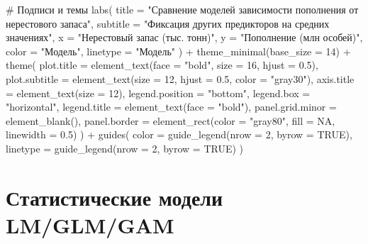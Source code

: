 \documentclass[
  letterpaper,
  DIV=11,
  numbers=noendperiod]{scrreprt}
\newenvironment{Shaded}{\begin{snugshade}}{\end{snugshade}}
\newcommand{\AttributeTok}[1]{\textcolor[rgb]{0.40,0.45,0.13}{#1}}
\newcommand{\CommentTok}[1]{\textcolor[rgb]{0.37,0.37,0.37}{#1}}
\newcommand{\ConstantTok}[1]{\textcolor[rgb]{0.56,0.35,0.01}{#1}}
\newcommand{\DecValTok}[1]{\textcolor[rgb]{0.68,0.00,0.00}{#1}}
\newcommand{\FloatTok}[1]{\textcolor[rgb]{0.68,0.00,0.00}{#1}}
\newcommand{\FunctionTok}[1]{\textcolor[rgb]{0.28,0.35,0.67}{#1}}
\newcommand{\NormalTok}[1]{\textcolor[rgb]{0.00,0.23,0.31}{#1}}
\newcommand{\SpecialCharTok}[1]{\textcolor[rgb]{0.37,0.37,0.37}{#1}}
\newcommand{\StringTok}[1]{\textcolor[rgb]{0.13,0.47,0.30}{#1}}
\begin{document}
\begin{Shaded}
\begin{Highlighting}[]
  \CommentTok{\# Подписи и темы}
  \FunctionTok{labs}\NormalTok{(}
    \AttributeTok{title =} \StringTok{"Сравнение моделей зависимости пополнения от нерестового запаса"}\NormalTok{,}
    \AttributeTok{subtitle =} \StringTok{"Фиксация других предикторов на средних значениях"}\NormalTok{,}
    \AttributeTok{x =} \StringTok{"Нерестовый запас (тыс. тонн)"}\NormalTok{,}
    \AttributeTok{y =} \StringTok{"Пополнение (млн особей)"}\NormalTok{,}
    \AttributeTok{color =} \StringTok{"Модель"}\NormalTok{,}
    \AttributeTok{linetype =} \StringTok{"Модель"}
\NormalTok{  ) }\SpecialCharTok{+}
  \FunctionTok{theme\_minimal}\NormalTok{(}\AttributeTok{base\_size =} \DecValTok{14}\NormalTok{) }\SpecialCharTok{+}
  \FunctionTok{theme}\NormalTok{(}
    \AttributeTok{plot.title =} \FunctionTok{element\_text}\NormalTok{(}\AttributeTok{face =} \StringTok{"bold"}\NormalTok{, }\AttributeTok{size =} \DecValTok{16}\NormalTok{, }\AttributeTok{hjust =} \FloatTok{0.5}\NormalTok{),}
    \AttributeTok{plot.subtitle =} \FunctionTok{element\_text}\NormalTok{(}\AttributeTok{size =} \DecValTok{12}\NormalTok{, }\AttributeTok{hjust =} \FloatTok{0.5}\NormalTok{, }\AttributeTok{color =} \StringTok{"gray30"}\NormalTok{),}
    \AttributeTok{axis.title =} \FunctionTok{element\_text}\NormalTok{(}\AttributeTok{size =} \DecValTok{12}\NormalTok{),}
    \AttributeTok{legend.position =} \StringTok{"bottom"}\NormalTok{,}
    \AttributeTok{legend.box =} \StringTok{"horizontal"}\NormalTok{,}
    \AttributeTok{legend.title =} \FunctionTok{element\_text}\NormalTok{(}\AttributeTok{face =} \StringTok{"bold"}\NormalTok{),}
    \AttributeTok{panel.grid.minor =} \FunctionTok{element\_blank}\NormalTok{(),}
    \AttributeTok{panel.border =} \FunctionTok{element\_rect}\NormalTok{(}\AttributeTok{color =} \StringTok{"gray80"}\NormalTok{, }\AttributeTok{fill =} \ConstantTok{NA}\NormalTok{, }\AttributeTok{linewidth =} \FloatTok{0.5}\NormalTok{)}
\NormalTok{  ) }\SpecialCharTok{+}
  \FunctionTok{guides}\NormalTok{(}
    \AttributeTok{color =} \FunctionTok{guide\_legend}\NormalTok{(}\AttributeTok{nrow =} \DecValTok{2}\NormalTok{, }\AttributeTok{byrow =} \ConstantTok{TRUE}\NormalTok{),}
    \AttributeTok{linetype =} \FunctionTok{guide\_legend}\NormalTok{(}\AttributeTok{nrow =} \DecValTok{2}\NormalTok{, }\AttributeTok{byrow =} \ConstantTok{TRUE}\NormalTok{)}
\NormalTok{  )}
\end{Highlighting}
\end{Shaded}

\section{Статистические модели
LM/GLM/GAM}\label{ux441ux442ux430ux442ux438ux441ux442ux438ux447ux435ux441ux43aux438ux435-ux43cux43eux434ux435ux43bux438-lmglmgam}
\end{document}
